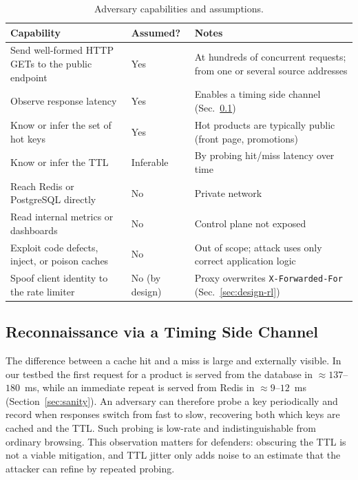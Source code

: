 \documentclass[preprint,12pt]{elsarticle}
\begin{document}
\begin{table}[t]
\centering
\caption{Adversary capabilities and assumptions.}
\label{tab:adversary}
\small
\begin{tabularx}{\linewidth}{@{}L{4.0cm}L{1.6cm}Y@{}}
\toprule
Capability & Assumed? & Notes \\
\midrule
Send well-formed HTTP GETs to the public endpoint & Yes & At hundreds of concurrent requests; from one or several source addresses \\
Observe response latency & Yes & Enables a timing side channel (Sec.~\ref{sec:recon}) \\
Know or infer the set of hot keys & Yes & Hot products are typically public (front page, promotions) \\
Know or infer the TTL & Inferable & By probing hit/miss latency over time \\
Reach Redis or PostgreSQL directly & No & Private network \\
Read internal metrics or dashboards & No & Control plane not exposed \\
Exploit code defects, inject, or poison caches & No & Out of scope; attack uses only correct application logic \\
Spoof client identity to the rate limiter & No (by design) & Proxy overwrites \texttt{X-Forwarded-For} (Sec.~\ref{sec:design-rl}) \\
\bottomrule
\end{tabularx}
\end{table}

\subsection{Reconnaissance via a Timing Side Channel}
\label{sec:recon}
The difference between a cache hit and a miss is large and externally visible. In our
testbed the first request for a product is served from the database in
${\approx}137$--$180$~ms, while an immediate repeat is served from Redis in
${\approx}9$--$12$~ms (Section~\ref{sec:sanity}). An adversary can therefore probe a
key periodically and record when responses switch from fast to slow, recovering both
which keys are cached and the TTL. Such probing is low-rate and indistinguishable from
ordinary browsing. This observation matters for defenders: obscuring the TTL is not a
viable mitigation, and TTL jitter only adds noise to an estimate that the attacker can
refine by repeated probing.
\end{document}
